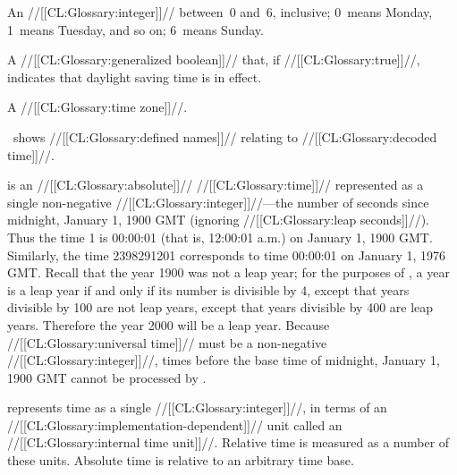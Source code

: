 
An //[[CL:Glossary:integer]]// between~0 and~6, inclusive;
0~means Monday, 1~means Tuesday, and so on; 6~means Sunday.
                      


A //[[CL:Glossary:generalized boolean]]// that,
if //[[CL:Glossary:true]]//, indicates that daylight saving time is in effect.
 


A //[[CL:Glossary:time zone]]//.

\endlist

\Thenextfigure\ shows //[[CL:Glossary:defined names]]// relating to //[[CL:Glossary:decoded time]]//.



\endsubsubsection%







 is an //[[CL:Glossary:absolute]]// //[[CL:Glossary:time]]// represented as a
single non-negative //[[CL:Glossary:integer]]//---the number of seconds since
midnight, January 1, 1900 GMT (ignoring //[[CL:Glossary:leap seconds]]//).
Thus the time 1 is 00:00:01 (that is, 12:00:01 a.m.) on January 1, 1900 GMT.
Similarly, the time 2398291201 corresponds to time 00:00:01 on January 1,
1976 GMT.
Recall that the year 1900 was not a leap year; for the purposes of
\clisp, a year is a leap year if and only if its number is divisible by 4,
except that years divisible by 100 are not leap years, except that years
divisible by 400 are leap years.  Therefore the year 2000 will
be a leap year.
Because //[[CL:Glossary:universal time]]// must be a non-negative //[[CL:Glossary:integer]]//,
times before the base time of midnight, January 1, 1900 GMT cannot be processed by \clisp.


\endsubsubsection%



 represents time as a single //[[CL:Glossary:integer]]//,
in terms of an //[[CL:Glossary:implementation-dependent]]// unit called an //[[CL:Glossary:internal time unit]]//.
Relative time is measured as a number of these units.
Absolute time is relative to an arbitrary time base.

